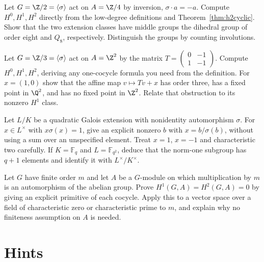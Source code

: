 \begin{exercise}[$\star\star$]\label{ex:v10new-ch08-inversion}
Let $G=\Z/2=\langle\sigma\rangle$ act on $A=\Z/4$ by inversion, $\sigma\cdot a=-a$. Compute $H^0,H^1,H^2$ directly from the low-degree definitions and Theorem~\ref{thm:h2cyclic}. Show that the two extension classes have middle groups the dihedral group of order eight and $Q_8$, respectively. Distinguish the groups by counting involutions.
\end{exercise}

\begin{exercise}[$\star\star\star$]\label{ex:v10new-ch08-affine}
Let $G=\Z/3=\langle\sigma\rangle$ act on $A=\Z^2$ by the matrix
$T=\begin{pmatrix}0&-1\\1&-1\end{pmatrix}$.
Compute $H^0,H^1,H^2$, deriving any one-cocycle formula you need from the definition. For $x=(1,0)$ show that the affine map $v\mapsto Tv+x$ has order three, has a fixed point in $\Q^2$, and has no fixed point in $\Z^2$. Relate that obstruction to its nonzero $H^1$ class.
\end{exercise}

\begin{exercise}[$\star\star$]\label{ex:v10new-ch08-quadratic90}
Let $L/K$ be a quadratic Galois extension with nonidentity automorphism $\sigma$. For $x\in L^\times$ with $x\sigma(x)=1$, give an explicit nonzero $b$ with $x=b/\sigma(b)$, without using a sum over an unspecified element. Treat $x=1$, $x=-1$ and characteristic two carefully. If $K=\mathbb F_q$ and $L=\mathbb F_{q^2}$, deduce that the norm-one subgroup has $q+1$ elements and identify it with $L^\times/K^\times$.
\end{exercise}

\begin{exercise}[$\star\star$]\label{ex:v10new-ch08-averaging}
Let $G$ have finite order $m$ and let $A$ be a $G$-module on which multiplication by $m$ is an automorphism of the abelian group. Prove $H^1(G,A)=H^2(G,A)=0$ by giving an explicit primitive of each cocycle. Apply this to a vector space over a field of characteristic zero or characteristic prime to $m$, and explain why no finiteness assumption on $A$ is needed.
\end{exercise}

\section{Hints}

